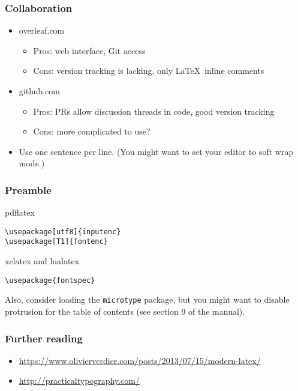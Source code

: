 \documentclass[aspectratio=1610]{beamer}
\begin{document}
\begin{frame}
    \frametitle{Collaboration}
    \begin{itemize}
        \item overleaf.com
            \begin{itemize}
                \item Pros: web interface, Git access
                \item Cons: version tracking is lacking, only \LaTeX\ inline comments
            \end{itemize}
        \item github.com
            \begin{itemize}
                \item Pros: PRs allow discussion threads in code, good version tracking
                \item Cons: more complicated to use?
            \end{itemize}
        \item Use one sentence per line. (You might want to set your editor to soft wrap mode.)
    \end{itemize}
\end{frame}

\begin{frame}[fragile]
    \frametitle{Preamble}
    \begin{beamerboxesrounded}{pdflatex}
        \begin{verbatim}
\usepackage[utf8]{inputenc}
\usepackage[T1]{fontenc}
        \end{verbatim}
    \end{beamerboxesrounded}
    \begin{beamerboxesrounded}{xelatex and lualatex}
        \begin{verbatim}
\usepackage{fontspec}
        \end{verbatim}
    \end{beamerboxesrounded}
    Also, consider loading the \texttt{microtype} package, but you might want to disable protrusion for the table of contents (see section 9 of the manual).
\end{frame}

\begin{frame}
    \frametitle{Further reading}
    \begin{itemize}
        \item \url{https://www.olivierverdier.com/posts/2013/07/15/modern-latex/}
        \item \url{http://practicaltypography.com/}
    \end{itemize}
\end{frame}

\end{document}
